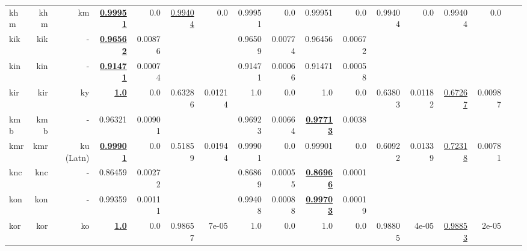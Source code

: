 \documentclass[11pt]{article}
\begin{document}
\begin{table*}[h]
{\begin{tabular}{lrrrrrrrrrrrrrrrr}
khm         & khm         & km         & \textbf{\underline{0.99951}}         & 0.0         & \underline{0.99404}         & 0.0         & 0.99951         & 0.0         & 0.99951         & 0.0         & 0.99404         & 0.0         & 0.99404         & 0.0         \\
kik         & kik         & -         & \textbf{\underline{0.96562}}         & 0.00876         &          &          & 0.96509         & 0.00774         & 0.96456         & 0.00672         &          &          &          &          \\
kin         & kin         & -         & \textbf{\underline{0.91471}}         & 0.00074         &          &          & 0.91471         & 0.00066         & 0.91471         & 0.00058         &          &          &          &          \\
kir         & kir         & ky         & \textbf{\underline{1.0}}         & 0.0         & 0.63286         & 0.01214         & 1.0         & 0.0         & 1.0         & 0.0         & 0.63803         & 0.01182         & \underline{0.67267}         & 0.00987         \\
kmb         & kmb         & -         & 0.96321         & 0.00901         &          &          & 0.96923         & 0.00664         & \textbf{\underline{0.97713}}         & 0.0038         &          &          &          &          \\
kmr         & kmr         & ku (Latn)         & \textbf{\underline{0.99901}}         & 0.0         & 0.51859         & 0.01944         & 0.99901         & 0.0         & 0.99901         & 0.0         & 0.60922         & 0.01339         & \underline{0.72318}         & 0.00781         \\
knc         & knc         & -         & 0.86459         & 0.00272         &          &          & 0.86869         & 0.00055         & \textbf{\underline{0.86966}}         & 0.0001         &          &          &          &          \\
kon         & kon         & -         & 0.99359         & 0.00111         &          &          & 0.99408         & 0.00088         & \textbf{\underline{0.99703}}         & 0.00019         &          &          &          &          \\
kor         & kor         & ko         & \textbf{\underline{1.0}}         & 0.0         & 0.98657         & 7e-05         & 1.0         & 0.0         & 1.0         & 0.0         & 0.98805         & 4e-05         & \underline{0.98853}         & 2e-05         \\

\end{tabular}}
\end{table*}
\end{document}
